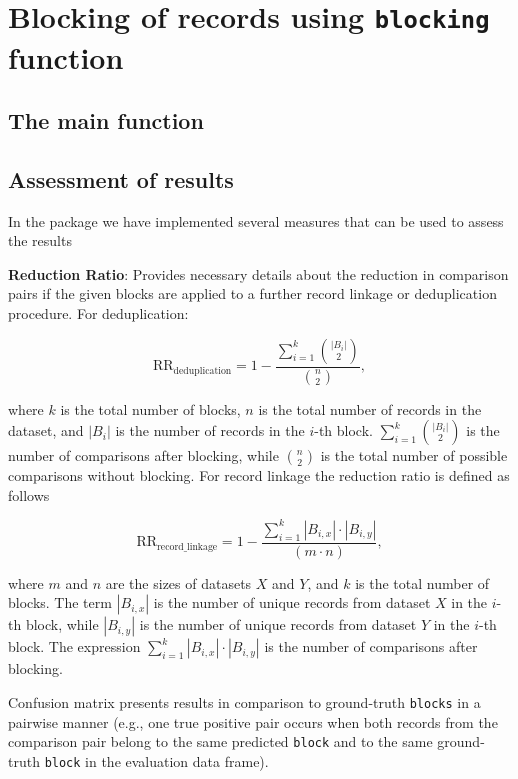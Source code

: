 \section{\texorpdfstring{Blocking of records using \texttt{blocking} function}{Blocking of records using blocking function}}\label{blocking-of-records-using-blocking-function}

\subsection{The main function}\label{the-main-function}

\subsection{Assessment of results}\label{assessment-of-results}

In the package we have implemented several measures that can be used to assess the results

\textbf{Reduction Ratio}: Provides necessary details about the reduction in comparison pairs if the given blocks are applied to a further record linkage or deduplication procedure. For deduplication:

\[
\text{RR}_{\text{deduplication}} = 1 - \frac{\sum\limits_{i=1}^{k} \binom{|B_i|}{2}}{\binom{n}{2}},
\]

where \(k\) is the total number of blocks, \(n\) is the total number of records in the dataset, and \(|B_i|\) is the number of records in the \(i\)-th block. \(\sum\limits_{i=1}^{k} \binom{|B_i|}{2}\) is the number of comparisons after blocking, while \(\binom{n}{2}\) is the total number of possible comparisons without blocking. For record linkage the reduction ratio is defined as follows

\[
\text{RR}_{\text{record\_linkage}} = 1 - \frac{\sum\limits_{i=1}^{k} |B_{i,x}| \cdot |B_{i,y}|} {(m \cdot n)},
\]

where \(m\) and \(n\) are the sizes of datasets \(X\) and \(Y\), and \(k\) is the total number of blocks. The term \(|B_{i,x}|\) is the number of unique records from dataset \(X\) in the \(i\)-th block, while \(|B_{i,y}|\) is the number of unique records from dataset \(Y\) in the \(i\)-th block. The expression \(\sum\limits_{i=1}^{k} |B_{i,x}| \cdot |B_{i,y}|\) is the number of comparisons after blocking.

Confusion matrix presents results in comparison to ground-truth \texttt{blocks} in a pairwise manner (e.g., one true positive pair occurs when both records from the comparison pair belong to the same predicted \texttt{block} and to the same ground-truth \texttt{block} in the evaluation data frame).

